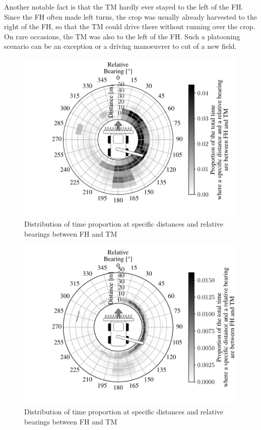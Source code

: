 \documentclass[]{nsm-thesis}
\begin{document}
Another notable fact is that the TM hardly ever stayed to the left of the \ac{FH}. Since the \ac{FH} often made left turns, the crop was usually already harvested to the right of the \ac{FH}, so that the TM could drive there without running over the crop. On rare occasions, the TM was also to the left of the \ac{FH}. Such a platooning scenario can be an exception or a driving manoeuvrer to cut of a new field.  



\begin{figure}%
	\centering
	\includegraphics[width=0.99\textwidth]{figures/bearingHarvestScenario.pdf}
	\caption{Distribution of time proportion at specific distances and relative bearings between \ac{FH} and \ac{TM}}%
	\label{fig:bearing}%
\end{figure}
\begin{figure}%
	\centering
	\includegraphics[width=0.99\textwidth]{figures/bearingHarvestScenario50.pdf}
	\caption{Distribution of time proportion at specific distances and relative bearings between \ac{FH} and \ac{TM}}%
	\label{fig:bearing2}%
\end{figure}
\end{document}
